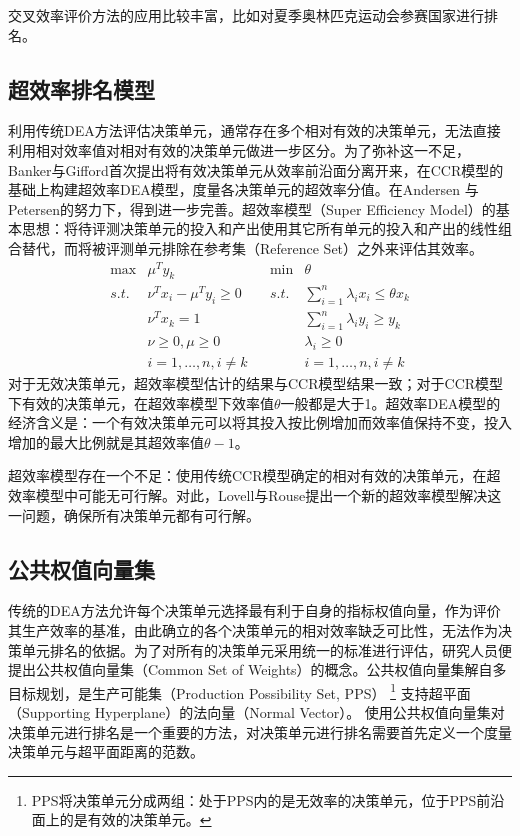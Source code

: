 交叉效率评价方法的应用比较丰富，比如对夏季奥林匹克运动会参赛国家进行排名\cite{de2008cross,de2009ranking,wu2009achievement}。

\subsection{超效率排名模型}
利用传统DEA方法评估决策单元，通常存在多个相对有效的决策单元，无法直接利用相对效率值对相对有效的决策单元做进一步区分。为了弥补这一不足，Banker与Gifford\cite{banker1988relative}首次提出将有效决策单元从效率前沿面分离开来，在CCR模型的基础上构建超效率DEA模型，度量各决策单元的超效率分值。在Andersen 与Petersen\cite{andersen1993procedure}的努力下，得到进一步完善。超效率模型（Super Efficiency Model）的基本思想：将待评测决策单元的投入和产出使用其它所有单元的投入和产出的线性组合替代，而将被评测单元排除在参考集（Reference Set）之外来评估其效率。
\begin{equation}\label{eq:superefficiency}
  \begin{array}{lllll}
    \max & \mu^T y_k & & \min & \theta\\
    \textit{s.t.} & \nu^T x_i - \mu^T y_i \ge 0 & & \textit{s.t.} & \sum\limits_{i=1}^n \lambda_i x_i \le \theta x_k\\
    & \nu^T x_k = 1 & & & \sum\limits_{i=1}^n \lambda_i y_i \ge y_k\\
    & \nu \ge 0,\mu \ge 0 & & & \lambda_i \ge 0\\
    & i = 1,\ldots, n , i \ne k &&& i = 1,\ldots, n, i \ne k
  \end{array}
\end{equation}
对于无效决策单元，超效率模型估计的结果与CCR模型结果一致；对于CCR模型下有效的决策单元，在超效率模型下效率值$\theta$一般都是大于1。超效率DEA模型的经济含义是：一个有效决策单元可以将其投入按比例增加而效率值保持不变，投入增加的最大比例就是其超效率值$\theta - 1$。

超效率模型存在一个不足：使用传统CCR模型确定的相对有效的决策单元，在超效率模型中可能无可行解。对此，Lovell与Rouse\cite{lovell2003equivalent}提出一个新的超效率模型解决这一问题，确保所有决策单元都有可行解。

\subsection{公共权值向量集}
传统的DEA方法允许每个决策单元选择最有利于自身的指标权值向量，作为评价其生产效率的基准，由此确立的各个决策单元的相对效率缺乏可比性，无法作为决策单元排名的依据。为了对所有的决策单元采用统一的标准进行评估，研究人员便提出公共权值向量集（Common Set of Weights）的概念。公共权值向量集解自多目标规划，是生产可能集（Production Possibility Set, PPS）
\footnote{PPS将决策单元分成两组：处于PPS内的是无效率的决策单元，位于PPS前沿面上的是有效的决策单元。}
支持超平面（Supporting Hyperplane）的法向量（Normal Vector）。 使用公共权值向量集对决策单元进行排名是一个重要的方法，对决策单元进行排名需要首先定义一个度量决策单元与超平面距离的范数\cite{cook1990dea,roll1991controlling,cook2007within,liu2008ranking,payan2011modified}。


